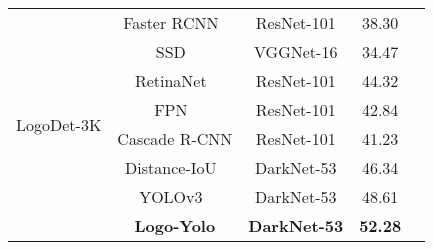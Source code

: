 \documentclass[journal]{IEEEtran}
\begin{document}
\begin{table}[!t]
{\begin{tabular}{ccccc}
			\multirow{8}{*}{LogoDet-3K} & Faster RCNN~\cite{Ren2015}                & ResNet-101         & 38.30            \\
			& SSD~\cite{liu2016ssd}                & VGGNet-16          & 34.47          \\
			& RetinaNet~\cite{Tsung2017Focal}      & ResNet-101         & 44.32            \\
			& FPN~\cite{Lin2017FPN}                                  & ResNet-101         & 42.84            \\
			& Cascade R-CNN\cite{Cai2018CascadeR-CNN}                        & ResNet-101         & 41.23            \\ 
			& Distance-IoU~\cite{Zheng2020Distance}                         & DarkNet-53         & 46.34    \\                                            
			& YOLOv3~\cite{Joseph2018Yolov3}       & DarkNet-53         & 48.61            \\
			& \textbf{Logo-Yolo}                   & \textbf{DarkNet-53}         & \textbf{52.28}   \\ \hline
	\end{tabular}}
\end{table}
\end{document}
